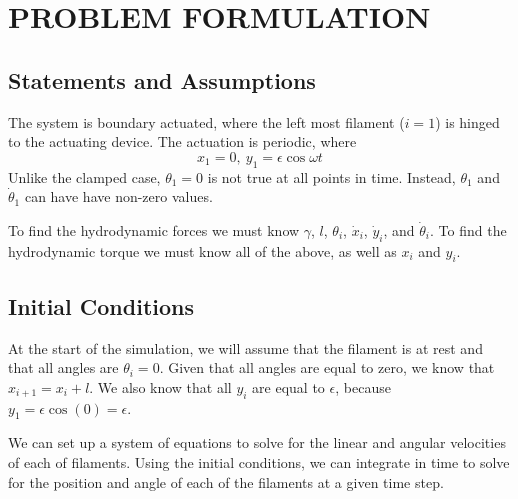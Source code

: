 \documentclass[12pt,letterpaper,titlepage]{article}
\begin{document}
\maketitle
\section{PROBLEM FORMULATION}
\subsection{Statements and Assumptions}
The system is boundary actuated, where the left most filament ($i=1$) is hinged to the actuating device. The actuation is periodic, where
\begin{equation}
x_1 = 0, \ y_1 = \epsilon \cos \omega t
\end{equation}
Unlike the clamped case, $\theta_1 = 0$ is not true at all points in time. Instead, $\theta_1$ and $\dot{\theta}_1$ can have have non-zero values.

To find the hydrodynamic forces we must know $\gamma$, $l$, $\theta_i$, $\dot{x}_i$, $\dot{y}_i$, and $\dot{\theta}_i$. To find the hydrodynamic torque we must know all of the above, as well as $x_i$ and $y_i$.

\subsection{Initial Conditions}
At the start of the simulation, we will assume that the filament is at rest and that all angles are $\theta_i = 0$. Given that all angles are equal to zero, we know that $x_{i+1} = x_{i} + l$. We also know that all $y_i$ are equal to $\epsilon$, because $y_1 = \epsilon \cos (0) = \epsilon$.

We can set up a system of equations to solve for the linear and angular velocities of each of filaments. Using the initial conditions, we can integrate in time to solve for the position and angle of each of the filaments at a given time step.
\end{document}
